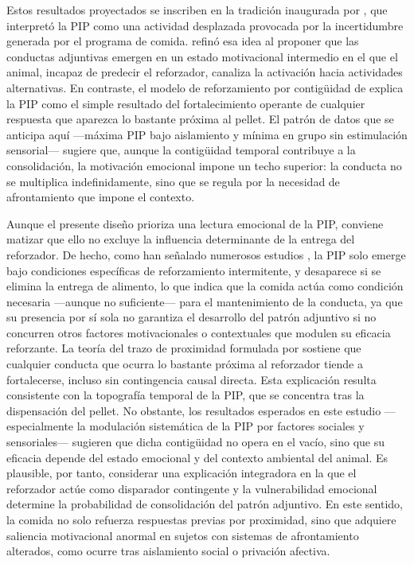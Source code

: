\documentclass[12pt,a4paper]{article}
\begin{document}
\begin{multicols}{2}
Estos resultados proyectados se inscriben en la tradición inaugurada por \citet{Falk1961}, que interpretó la PIP como una actividad desplazada provocada por la incertidumbre generada por el programa de comida. \citet{Staddon1977} refinó esa idea al proponer que las conductas adjuntivas emergen en un estado motivacional intermedio en el que el animal, incapaz de predecir el reforzador, canaliza la activación hacia actividades alternativas. En contraste, el modelo de reforzamiento por contigüidad de \citet{Killeen2013} explica la PIP como el simple resultado del fortalecimiento operante de cualquier respuesta que aparezca lo bastante próxima al pellet. El patrón de datos que se anticipa aquí —máxima PIP bajo aislamiento y mínima en grupo sin estimulación sensorial— sugiere que, aunque la contigüidad temporal contribuye a la consolidación, la motivación emocional impone un techo superior: la conducta no se multiplica indefinidamente, sino que se regula por la necesidad de afrontamiento que impone el contexto.

Aunque el presente diseño prioriza una lectura emocional de la PIP, conviene matizar que ello no excluye la influencia determinante de la entrega del reforzador. De hecho, como han señalado numerosos estudios \citep{Pellon2004}, la PIP solo emerge bajo condiciones específicas de reforzamiento intermitente, y desaparece si se elimina la entrega de alimento, lo que indica que la comida actúa como condición necesaria —aunque no suficiente— para el mantenimiento de la conducta, ya que su presencia por sí sola no garantiza el desarrollo del patrón adjuntivo si no concurren otros factores motivacionales o contextuales que modulen su eficacia reforzante. La teoría del trazo de proximidad formulada por \citet{Killeen2013} sostiene que cualquier conducta que ocurra lo bastante próxima al reforzador tiende a fortalecerse, incluso sin contingencia causal directa. Esta explicación resulta consistente con la topografía temporal de la PIP, que se concentra tras la dispensación del pellet. No obstante, los resultados esperados en este estudio —especialmente la modulación sistemática de la PIP por factores sociales y sensoriales— sugieren que dicha contigüidad no opera en el vacío, sino que su eficacia depende del estado emocional y del contexto ambiental del animal. Es plausible, por tanto, considerar una explicación integradora en la que el reforzador actúe como disparador contingente y la vulnerabilidad emocional determine la probabilidad de consolidación del patrón adjuntivo. En este sentido, la comida no solo refuerza respuestas previas por proximidad, sino que adquiere saliencia motivacional anormal en sujetos con sistemas de afrontamiento alterados, como ocurre tras aislamiento social o privación afectiva.


\end{multicols}
\end{document}
